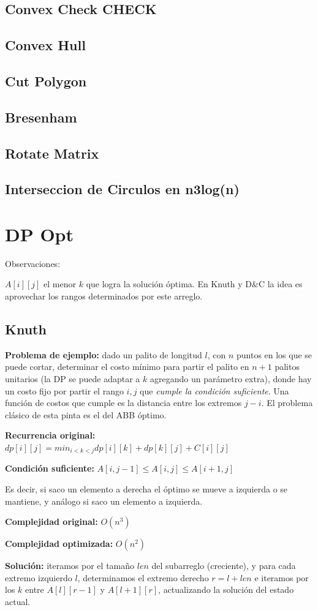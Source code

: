 \subsection{Convex Check CHECK}
\subsection{Convex Hull}
\subsection{Cut Polygon}
\subsection{Bresenham}
\subsection{Rotate Matrix}
\subsection{Interseccion de Circulos en n3log(n)}

\section{DP Opt}
Observaciones:

$A[i][j]$ el menor $k$ que logra la solución óptima. En Knuth y D\&C la idea es aprovechar los rangos
determinados por este arreglo.

\subsection{Knuth}
{
    \textbf{Problema de ejemplo:} dado un palito de longitud $l$, con $n$ puntos en los que se puede cortar,
    determinar el costo mínimo para partir el palito en $n+1$ palitos unitarios (la DP se puede adaptar a $k$ 
    agregando un parámetro extra), donde hay un costo fijo por partir el rango $i, j$ que \emph{cumple la 
    condición suficiente}. Una función de costos que cumple es la distancia entre los extremos $j-i$. 
    El problema clásico de esta pinta es el del ABB óptimo.

    \textbf{Recurrencia original:} $dp[i][j] = min_{i < k < j} {dp[i][k] + dp[k][j]} + C[i][j]$

    \textbf{Condición suficiente:} $A[i, j - 1] \leq  A[i, j] \leq A[i + 1, j]$

    Es decir, si saco un elemento a derecha el óptimo se mueve a izquierda o se mantiene, y 
    análogo si saco un elemento a izquierda.

    \textbf{Complejidad original:} $O(n^3)$

    \textbf{Complejidad optimizada:} $O(n^2)$

    \textbf{Solución:} iteramos por el tamaño $len$ del subarreglo (creciente), y para cada extremo izquierdo $l$,
    determinamos el extremo derecho $r=l+len$ e iteramos por los $k$ entre $A[l][r-1]$ y $A[l+1][r]$, actualizando la
    solución del estado actual.
}
